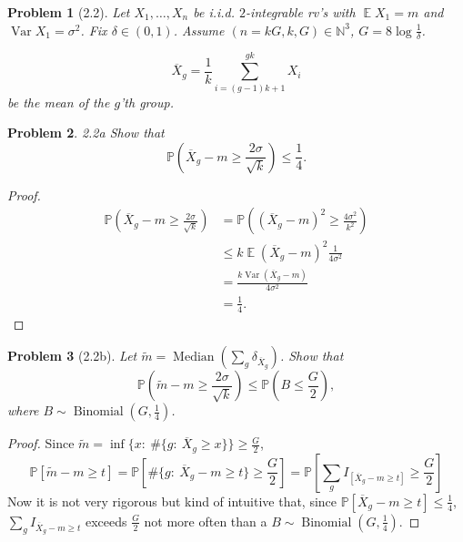 \documentclass{article}
\newtheorem{problem}{Problem}
\newcommand{\expect}{\operatorname{\mathbb{E}}}
\begin{document}
\begin{problem}[2.2]
Let \( X_1, \ldots, X_n \)
be i.i.d. \( 2 \)-integrable rv's
with \( \expect X_1 = m \)
and \( \operatorname{Var}X_1 = \sigma^2 \).
Fix \( \delta\in(0,1) \).
Assume \( (n=kG, k, G)\in \mathbb{N}^3 \),
\( G = 8\log\frac1\delta \).

\[
\overline{X}_g = \frac1k \sum_{i=(g-1)k+1}^{gk} X_i
\]
be the mean of the \( g \)'th group.
\end{problem}
\begin{problem}{2.2a}
Show that \[
\mathbb{P}(\overline{X}_g - m \geq \frac{2\sigma}{\sqrt{k}}) \leq \frac14.
\]
\end{problem}
\begin{proof}
\[\begin{split}
\mathbb{P}\left(\overline{X}_g - m \geq \frac{2\sigma}{\sqrt{k}}\right)
&= \mathbb{P}\left((\overline{X}_g - m)^2 \geq \frac{4\sigma^2}{k^2}\right) \\
&\leq k\expect(\overline{X}_g - m)^2\frac{1}{4\sigma^2} \\
&= \frac{k\operatorname{Var}(\overline{X}_g - m)}{4\sigma^2} \\
&= \frac14.
\end{split}\]

\end{proof}

\begin{problem}[2.2b]
Let \( \tilde{m} = \operatorname{Median}(\sum_g \delta_{\overline{X}_g}) \).
Show that
\[
\mathbb{P}\left(\tilde{m} - m \geq \frac{2\sigma}{\sqrt{k}}\right)
\leq \mathbb{P}(B \leq \frac{G}{2}),
\]
where \( B\sim\operatorname{Binomial}(G, \frac14) \).
\end{problem}
\begin{proof}
Since \( \tilde{m} = \inf\{x:~\#\{g:~\overline{X}_g\geq x\}\} \geq \frac{G}{2} \),
\[
\mathbb{P}\left[\tilde{m} - m \geq t \right]
= \mathbb{P}\left[
\#\{g:~\overline{X}_g - m\geq t\} \geq \frac{G}{2}
\right]
= \mathbb{P}\left[
\sum_g I_{[\overline{X}_g - m\geq t]} \geq \frac{G}{2}
\right]
\]
Now it is not very rigorous but kind of intuitive that,
since \( \mathbb{P}\left[ \overline{X}_g - m \geq t \right] \leq \frac14 \),
\( \sum_g I_{\overline{X}_g - m \geq t} \)
exceeds \( \frac{G}{2} \) not more often
than a \( B\sim\operatorname{Binomial}(G, \frac14) \).
\end{proof}
\end{document}
